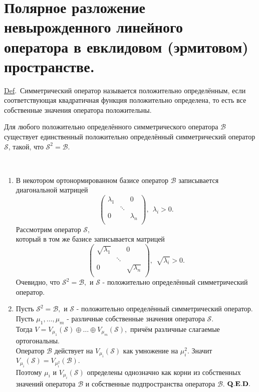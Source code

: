 \documentclass[draft]{article}%
\newcommand{\de}{\par\noindent\underline{Def}.\ }%
\newcommand{\ab}{\par\noindent}%
\newcommand{\dok}{\par\noindent{\textsl{Доказательство}.}\ }%
\newcommand{\qed}{\quad${{\bf Q.E.D.}}$}
\newcommand{\ps}{\oplus}
\newcommand{\op}[1]{$\mathcal{#1}$}
\newcommand{\om}[1]{\mathcal{#1}}
\begin{document}
\section{Полярное разложение невырожденного линейного\\ оператора в евклидовом (эрмитовом) пространстве.}
\label{q32}%
\de Симметрический оператор называется положительно определённым, если соответствующая квадратичная функция
положительно определена, то есть все собственные значения оператора положительны. %
\ab{\bf Лемма.} Для любого положительно определённого симметрического оператора \op{B} существует
единственный
положительно определённый симметрический оператор \op{S}, такой, что $\om{S}^2=\om{B}$.%
\dok \begin{enumerate}
    \item В некотором ортонормированном базисе оператор $\om{B}$ записывается диагональной матрицей
    $$\left(%
\begin{array}{ccc}
  \lambda_1 &  & 0 \\
   & \ddots &  \\
  0 &  & \lambda_n \\
\end{array}%
\right),\  \ \lambda_i>0.$$ Рассмотрим оператор \op{S},\\ который в том же базисе записывается матрицей
$$\left(%
\begin{array}{ccc}
  \sqrt{\lambda_1} &  & 0 \\
   & \ddots &  \\
  0 &  & \sqrt{\lambda_n} \\
\end{array}%
\right),\ \ \sqrt{\lambda_i}>0.$$
Очевидно, что $\om{S}^2=\om{B},$ и \op{S} - положительно определённый симметрический оператор.
    \item Пусть $\om{S}^2=\om{B},$ и \op{S} - положительно определённый симметрический оператор.\\
    Пусть $\mu_1,\dots,\mu_m$ - различные собственные значения оператора \op{S}.\\
    Тогда $V=V_{\mu_1}(\om{S})\ps\dots\ps V_{\mu_{m}}(\om{S}),$
    причём различные слагаемые ортогональны.\\ Оператор \op{B} действует на $V_{\mu_i}(\om{S})$ как умножение на
    $\mu_i^2$. Значит $V_{\mu_i}(\om{S})=V_{\mu_i^2}(\om{B}).$\\ Поэтому $\mu_i$ и $V_{\mu_i}(\om{S})$ определены
    однозначно как корни из собственных значений оператора $\om{B}$ и собственные подпространства оператора
    $\om{B}$. \qed
\end{enumerate}
\end{document}

